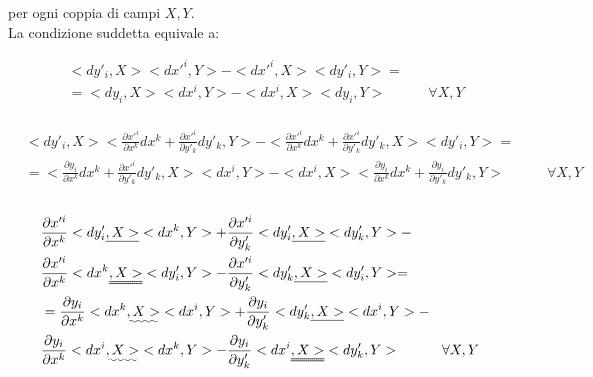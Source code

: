 per ogni coppia di campi $ X, Y $. \\
La condizione suddetta equivale a:

\begin{equation*}
\begin{split}
&<dy'_i, X><dx'^i, Y>-<dx'^i, X><dy'_i, Y> =\\
&= <dy_i, X><dx^i, Y>-<dx^i, X><dy_i, Y>  \quad \qquad \forall X, Y
\end{split}
\end{equation*}
\\
\begin{equation*}
\begin{split}
&<dy'_i, X> <\frac{\partial x'^i}{\partial x^k} dx^k + \frac{\partial x'^i}{\partial y'_k}dy'_k, Y> - <\frac{\partial x'^i}{\partial x^k} dx^k + \frac{\partial x'^i}{\partial y'_k} dy'_k, X><dy'_i, Y> = \\
&= <\frac{\partial y_i}{\partial x^k} dx^k + \frac{\partial x'^i}{\partial y'_k} dy'_k, X><dx^i, Y> - <dx^i, X><\frac{\partial y_i}{\partial x^k} dx^k + \frac{\partial y_i}{\partial y'_k} dy'_k, Y> \quad \qquad \forall X, Y
\end{split}
\end{equation*}
\\


\begin{equation*}
\begin{split}
&\frac{\partial x'^i}{\partial x^k} <dy'_i \uline{, X>}<dx^k, Y> + \frac{\partial x'^i}{\partial y'_k} <dy'_i \uline{, X>}<dy'_k, Y> - \\
&\frac{\partial x'^i}{\partial x^k} <dx^k \uuline{, X>}<dy'_i, Y> - \frac{\partial x'^i}{\partial y'_k} <dy'_k \uline{, X>}<dy'_i, Y> = \\
&= \frac{\partial y_i}{\partial x^k}<dx^k \uwave{, X>}<dx^i, Y> + \frac{\partial y_i}{\partial y'_k}<dy'_k \uline{, X>}<dx^i, Y> - \\
& \frac{\partial y_i}{\partial x^k}<dx^i \uwave{, X>}<dx^k, Y> - \frac{\partial y_i}{\partial y'_k}<dx^i \uuline{, X>}<dy'_k, Y> \quad \qquad \forall X, Y
\end{split}
\end{equation*}

